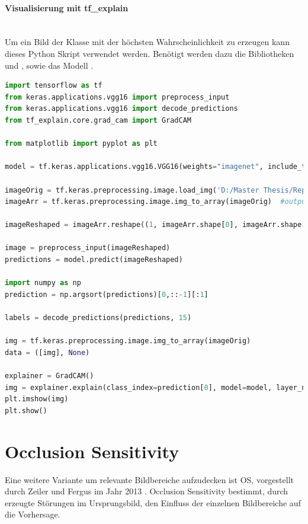 \documentclass[
  12pt, %
  a4paper, %
  oneside, %
  openany, 
  numbers=noenddot, %
  BCOR=5mm, %
  parskip=half*, %
  thesis, %
]{bfhbook}
\newcommand{\parag}[1]{\paragraph*{#1}\mbox{}\\}
\begin{document}
\parag{Visualisierung mit tf\_explain}
Um ein Bild der Klasse mit der höchsten Wahrscheinlichkeit zu erzeugen kann dieses Python Skript verwendet werden. Benötigt werden dazu die Bibliotheken \parencite{TensorFlow} und  \parencite{tfExplain}, sowie das Modell \parencite{vgg16}.
\begin{lstlisting}[language=Python, caption=Grad CAM Visualisierung für die wahrscheinlichste Klasse]
import tensorflow as tf
from keras.applications.vgg16 import preprocess_input
from keras.applications.vgg16 import decode_predictions
from tf_explain.core.grad_cam import GradCAM

from matplotlib import pyplot as plt

model = tf.keras.applications.vgg16.VGG16(weights="imagenet", include_top=True)

imageOrig = tf.keras.preprocessing.image.load_img('D:/Master Thesis/Repo/Test Images/tabby.2.JPG', target_size=(224, 224))
imageArr = tf.keras.preprocessing.image.img_to_array(imageOrig)  #output Numpy-array

imageReshaped = imageArr.reshape((1, imageArr.shape[0], imageArr.shape[1], imageArr.shape[2]))

image = preprocess_input(imageReshaped)
predictions = model.predict(imageReshaped)

import numpy as np
prediction = np.argsort(predictions)[0,::-1][:1]

labels = decode_predictions(predictions, 15)

img = tf.keras.preprocessing.image.img_to_array(imageOrig)
data = ([img], None)
    
explainer = GradCAM()
img = explainer.explain(class_index=prediction[0], model=model, layer_name='block5_conv3', validation_data=data)
plt.imshow(img)
plt.show()
\end{lstlisting}

\section{Occlusion Sensitivity}
\label{os}
Eine weitere Variante um relevante Bildbereiche aufzudecken ist \Gls{OS}, vorgestellt durch Zeiler  und Fergus im Jahr 2013 \parencite{Zeiler2013}. Occlusion Sensitivity bestimmt, durch erzeugte Störungen im Ursprungsbild, den Einfluss der einzelnen Bildbereiche auf die Vorhersage.
\end{document}
